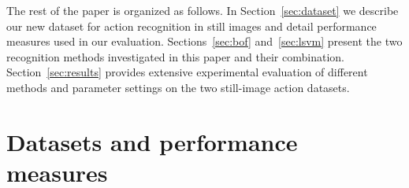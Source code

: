 \documentclass{bmvc2k}
\newcommand{\secnspc}{\vspace*{-2mm}}
\begin{document}
The rest of the paper is organized as follows. In Section~\ref{sec:dataset} we describe our new dataset for action recognition in still images and detail performance measures used in our evaluation. Sections~\ref{sec:bof} and~\ref{sec:lsvm} present the two recognition methods investigated in this paper and their combination. Section~\ref{sec:results} provides extensive experimental evaluation of different methods and parameter settings on the two still-image action datasets. %





% 
%  



\secnspc
\section{Datasets and performance measures}
\secnspc
\label{sec:dataset}
\end{document}
